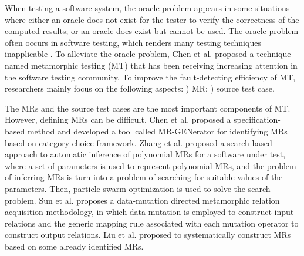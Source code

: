 \documentclass[10pt,journal,compsoc]{IEEEtran}
\newcommand{\rmnum}[1]{\expandafter{\romannumeral #1\relax}}
\begin{document}
When testing a software system, the oracle problem appears in some situations where either an oracle does not exist for the tester to verify the correctness of the computed results; or an oracle does exist but cannot be used. The oracle problem often occurs in software testing, which renders many testing techniques inapplicable \cite{barr2015oracle}. To alleviate the oracle problem, Chen et al. \cite{chen1998metamorphic} proposed a technique named metamorphic testing (MT) that has been receiving increasing attention in the software testing community\cite{barr2015oracle, segura2016survey, chen2018metamorphic}. To improve the fault-detecting efficiency of MT, researchers mainly focus on the following aspects: \rmnum{1}) MR; \rmnum{2}) source test case.

The MRs and the source test cases are the most important components of MT. However, defining MRs can be difficult. 
Chen et al. \cite{chen2016metric} proposed a specification-based method and developed a tool called MR-GENerator for identifying MRs based on category-choice framework\cite{ostrand1988category}.
Zhang et al. \cite{zhang2014search} proposed a search-based approach to automatic inference of polynomial MRs for a software under test, where a set of parameters is used to represent polynomial MRs, and the problem of inferring MRs is turn into a problem of searching for suitable values of the parameters. Then, particle swarm optimization is used to solve the search problem.
Sun et al. \cite{sun2016mumt} proposes a data-mutation directed metamorphic relation acquisition methodology, in which data mutation is employed to construct input relations and the generic mapping rule associated with each mutation operator to construct output relations.
Liu et al. \cite{liu2012new} proposed to systematically construct MRs based on some already identified MRs.
\end{document}
